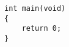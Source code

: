 \documentclass{article}
\begin{document}
\begin{lstlisting}[frame=single]
int main(void)
{
	return 0;
}
\end{lstlisting}
\end{document}

